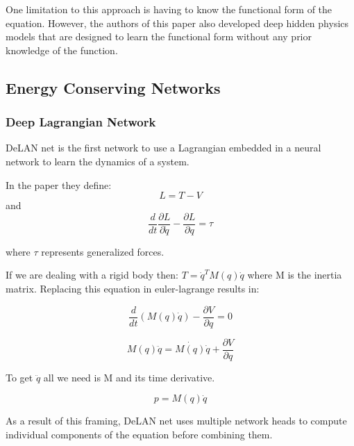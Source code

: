 \documentclass{article}
\begin{document}
One limitation to this approach is having to know the functional form of the equation. However, the authors of this paper also developed deep hidden physics models \cite{raissi_physics-informed_2019} that are designed to learn the functional form without any prior knowledge of the function. 

\subsection{Energy Conserving Networks}
\subsubsection{Deep Lagrangian Network}

DeLAN net is the first network to use a Lagrangian embedded in a neural network to learn the dynamics of a system. 

In the paper they define:
$$ L = T - V$$
and
$$ \frac{d}{dt}\frac{\partial L}{\partial \dot{q}} - \frac{\partial L}{\partial q} = \tau $$

where $\tau$ represents generalized forces.

If we are dealing with a rigid body then: $ T = \dot{q}^T M(q) \dot{q} $ where M is the inertia matrix. Replacing this equation in euler-lagrange results in:

$$ \frac{d}{dt} (M(q)\dot{q}) - \frac{\partial V}{\partial q} = 0 $$

$$ M(q)\ddot{q} = \dot{M(q)} \dot{q} + \frac{\partial V}{\partial q} $$

To get $\ddot{q}$ all we need is M and its time derivative. 

$$ p = M(q) \dot{q} $$

As a result of this framing, DeLAN net uses multiple network heads to compute individual components of the equation before combining them. 
\end{document}

